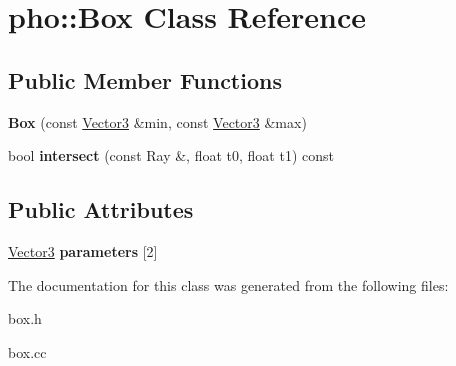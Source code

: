 \hypertarget{classpho_1_1Box}{\section{pho\-:\-:Box Class Reference}
\label{classpho_1_1Box}
}
\subsection*{Public Member Functions}
\begin{DoxyCompactItemize}
\item 
\hypertarget{classpho_1_1Box_a08032b3766c61526c555651c434d5bec}{{\bfseries Box} (const \hyperlink{classpho_1_1Vector3}{Vector3} \&min, const \hyperlink{classpho_1_1Vector3}{Vector3} \&max)}\label{classpho_1_1Box_a08032b3766c61526c555651c434d5bec}

\item 
\hypertarget{classpho_1_1Box_a2ebbc99e20bf99038d07856b2d05fbed}{bool {\bfseries intersect} (const Ray \&, float t0, float t1) const }\label{classpho_1_1Box_a2ebbc99e20bf99038d07856b2d05fbed}

\end{DoxyCompactItemize}
\subsection*{Public Attributes}
\begin{DoxyCompactItemize}
\item 
\hypertarget{classpho_1_1Box_ac74266938b9d2c47be56c4ec553c7e8e}{\hyperlink{classpho_1_1Vector3}{Vector3} {\bfseries parameters} \mbox{[}2\mbox{]}}\label{classpho_1_1Box_ac74266938b9d2c47be56c4ec553c7e8e}

\end{DoxyCompactItemize}


The documentation for this class was generated from the following files\-:\begin{DoxyCompactItemize}
\item 
box.\-h\item 
box.\-cc\end{DoxyCompactItemize}
